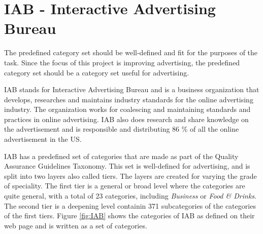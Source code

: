 \section{IAB - Interactive Advertising Bureau}
The predefined category set should be well-defined and fit for the purposes of the task. Since the focus of this project is improving advertising, the predefined category set should be a category set useful for advertising. 




IAB stands for Interactive Advertising Bureau and is a business organization that develops, researches and maintains industry standards for the online advertising industry. The organization works for coalescing and maintaining standards and practices in online advertising. IAB also does research and share knowledge on the advertisement and is responsible and distributing 86 \% of all the online advertisement in the US. \cite{IABabout}

IAB has a predefined set of categories that are made as part of the Quality Assurance Guidelines Taxonomy. This set is well-defined for advertising, and is split into two layers also called tiers. The layers are created for varying the grade of speciality. The first tier is a general or broad level where the categories are quite general, with a total of 23 categories, including \textit{Business} or \textit{Food \& Drinks}. The second tier is a deepening level containin 371 subcategories of the categories of the first tiers.
Figure \ref{fig:IAB} 
shows the categories of IAB as defined on their web page and is written as a set of categories. 






